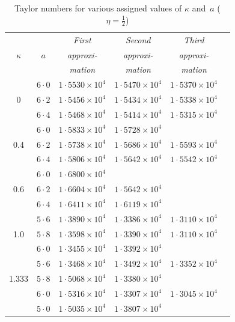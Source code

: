 \begin{table}[ht]
\centering
\caption{Taylor numbers for various assigned values of $\kappa$ and~$a$ ($\eta = \frac{1}{2}$)}
\label{tab:XXXIV}
\medskip
\small
\begin{tabular}{cccccc}
\hline
& & \textit{First} & \textit{Second} & \textit{Third} \\
$\kappa$ & $a$ & \textit{approxi-} & \textit{approxi-} & \textit{approxi-} \\
& & \textit{mation} & \textit{mation} & \textit{mation} \\
\hline
  & $6{\cdot}0$ & $1{\cdot}5530\times10^4$ & $1{\cdot}5470\times10^4$ & $1{\cdot}5370\times10^4$ \\
0 & $6{\cdot}2$ & $1{\cdot}5456\times10^4$ & $1{\cdot}5434\times10^4$ & $1{\cdot}5338\times10^4$ \\
  & $6{\cdot}4$ & $1{\cdot}5468\times10^4$ & $1{\cdot}5414\times10^4$ & $1{\cdot}5315\times10^4$ \\
\hline
    & $6{\cdot}0$ & $1{\cdot}5833\times10^4$ & $1{\cdot}5728\times10^4$ & \\
0.4 & $6{\cdot}2$ & $1{\cdot}5738\times10^4$ & $1{\cdot}5686\times10^4$ & $1{\cdot}5593\times10^4$ \\
    & $6{\cdot}4$ & $1{\cdot}5806\times10^4$ & $1{\cdot}5642\times10^4$ & $1{\cdot}5542\times10^4$ \\
\hline
    & $6{\cdot}0$ & $1{\cdot}6800\times10^4$ & & \\
0.6 & $6{\cdot}2$ & $1{\cdot}6604\times10^4$ & $1{\cdot}5642\times10^4$ & \\
    & $6{\cdot}4$ & $1{\cdot}6411\times10^4$ & $1{\cdot}6119\times10^4$ & \\
\hline
    & $5{\cdot}6$ & $1{\cdot}3890\times10^4$ & $1{\cdot}3386\times10^4$ & $1{\cdot}3110\times10^4$ \\
1.0 & $5{\cdot}8$ & $1{\cdot}3598\times10^4$ & $1{\cdot}3390\times10^4$ & $1{\cdot}3110\times10^4$ \\
    & $6{\cdot}0$ & $1{\cdot}3455\times10^4$ & $1{\cdot}3392\times10^4$ & \\
\hline
     & $5{\cdot}6$ & $1{\cdot}3468\times10^4$ & $1{\cdot}3492\times10^4$ & $1{\cdot}3352\times10^4$ \\
1.333 & $5{\cdot}8$ & $1{\cdot}5068\times10^4$ & $1{\cdot}3380\times10^4$ & \\
      & $6{\cdot}0$ & $1{\cdot}5316\times10^4$ & $1{\cdot}3307\times10^4$ & $1{\cdot}3045\times10^4$ \\
\hline
    & $5{\cdot}0$ & $1{\cdot}5035\times10^4$ & $1{\cdot}3807\times10^4$ & \\

\end{tabular}
\end{table}
